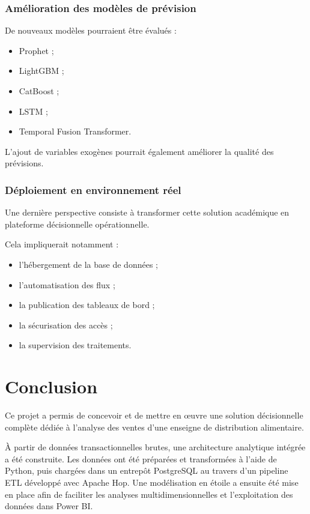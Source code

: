 \documentclass[12pt,a4paper,twoside]{report}
\begin{document}
\subsection{Amélioration des modèles de prévision}

De nouveaux modèles pourraient être évalués :

\begin{itemize}
    \item Prophet ;
    \item LightGBM ;
    \item CatBoost ;
    \item LSTM ;
    \item Temporal Fusion Transformer.
\end{itemize}

L'ajout de variables exogènes pourrait également améliorer la qualité des prévisions.

\subsection{Déploiement en environnement réel}

Une dernière perspective consiste à transformer cette solution académique en plateforme décisionnelle opérationnelle.

Cela impliquerait notamment :

\begin{itemize}
    \item l'hébergement de la base de données ;
    \item l'automatisation des flux ;
    \item la publication des tableaux de bord ;
    \item la sécurisation des accès ;
    \item la supervision des traitements.
\end{itemize}

\chapter{Conclusion}

Ce projet a permis de concevoir et de mettre en œuvre une solution décisionnelle complète dédiée à l'analyse des ventes d'une enseigne de distribution alimentaire.

À partir de données transactionnelles brutes, une architecture analytique intégrée a été construite. Les données ont été préparées et transformées à l'aide de Python, puis chargées dans un entrepôt PostgreSQL au travers d'un pipeline ETL développé avec Apache Hop. Une modélisation en étoile a ensuite été mise en place afin de faciliter les analyses multidimensionnelles et l'exploitation des données dans Power BI.
\end{document}
